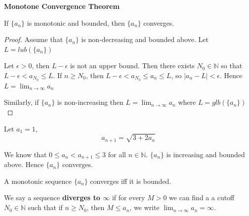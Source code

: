 \begin{thm}\textbf{Monotone Convergence Theorem}

If $\{a_n\}$ is monotonic and bounded, then $\{a_n\}$ converges.
\end{thm}

\begin{proof}
Assume that $\{a_n\}$ is non-decreasing and bounded above. Let $L = lub(\{a_n\})$

Let $\epsilon > 0$, then $L-\epsilon$ is not an upper bound. Then there exists $N_0\in \mathbb{N}$ so that $L-\epsilon < a_{N_0} \leq L$. If $n\geq N_0$, then $L-\epsilon < a_{N_0} \leq a_n \leq L$, so $|a_n - L| < \epsilon$. Hence $L = \lim_{n\to \infty} a_n$

Similarly, if $\{a_n\}$ is non-increasing then $L = \lim_{n\to \infty} a_n$ where $L = glb(\{a_n\})$
\end{proof}

\begin{exmp}
Let $a_1=1$,$$a_{n+1} = \sqrt{3+2a_n}$$
\end{exmp}

We know that $0\leq a_n < a_{n+1} \leq 3$ for all $n\in \mathbb{N}$. $\{a_n\}$ is increasing and bounded above. Hence $\{a_n\}$ converges.


\begin{cor}
A monotonic sequence $\{a_n\}$ converges iff it is bounded.
\end{cor}

\begin{defn}
We say a sequence \textbf{diverges to $\infty$} if for every $M>0$ we can find a a cutoff $N_0 \in \mathbb{N}$ such that if $n\geq N_0$, then $M\leq a_n$, we write $\lim_{n\to \infty} a_n = \infty$.
\end{defn}


